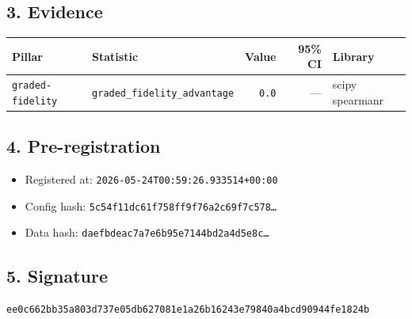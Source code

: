 \documentclass{article}
\begin{document}
\subsection*{3. Evidence}
\begin{tabular}{llrrl}\toprule
\textbf{Pillar} & \textbf{Statistic} & \textbf{Value} & \textbf{95\% CI} & \textbf{Library} \\\midrule
\texttt{graded-fidelity} & \texttt{graded\_fidelity\_advantage} & \texttt{0.0} & --- & scipy spearmanr \\
\bottomrule\end{tabular}
\subsection*{4. Pre-registration}
\begin{itemize}
\item Registered at: \texttt{2026-05-24T00:59:26.933514+00:00}
\item Config hash: \texttt{5c54f11dc61f758ff9f76a2c69f7c578\dots}
\item Data hash: \texttt{daefbdeac7a7e6b95e7144bd2a4d5e8c\dots}
\end{itemize}
\subsection*{5. Signature}
\texttt{ee0c662bb35a803d737e05db627081e1a26b16243e79840a4bcd90944fe1824b}\\
\end{document}
